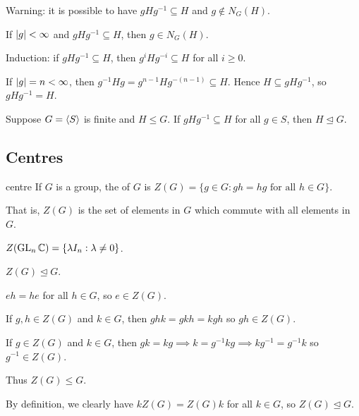 \documentclass[12pt,letterpaper]{report}
\begin{document}
Warning: it is possible to have $gHg^{-1} \subseteq H$ and $g \not\in N_G(H)$.

\begin{lem}{}{}
  If $\lvert g\rvert < \infty$ and $gHg^{-1} \subseteq H$, then $g \in N_G(H)$.
\end{lem}

\begin{thmproof}
  Induction: if $gHg^{-1} \subseteq H$, then $g^iHg^{-i} \subseteq H$ for all $i \geq 0$.

  If $\lvert g\rvert = n < \infty$, then $g^{-1}Hg = g^{n - 1}Hg^{-(n - 1)} \subseteq H$.
  Hence $H \subseteq gHg^{-1}$, so $gHg^{-1} = H$.
\end{thmproof}

\begin{cor}{}{}
  Suppose $G = \langle S\rangle$ is finite and $H \leq G$.
  If $gHg^{-1} \subseteq H$ for all $g \in S$, then $H \trianglelefteq G$.
\end{cor}

\pagebreak
\subsection{Centres}

\begin{defn}{centre}{}
  If $G$ is a group, the  of $G$ is
  $Z(G) = \{g \in G : gh = hg \text{ for all } h \in G\}$.
\end{defn}

That is, $Z(G)$ is the set of elements in $G$ which commute with all elements in $G$.

\begin{ex}
  $Z(\operatorname{GL}_n\mathbb{C}) = \{\lambda I_n : \lambda \neq 0\}$.
\end{ex}

\begin{prop}{}{}
  $Z(G) \trianglelefteq G$.
\end{prop}

\begin{thmproof}
  $eh = he$ for all $h \in G$, so $e \in Z(G)$.

  If $g, h \in Z(G)$ and $k \in G$, then $ghk = gkh = kgh$ so $gh \in Z(G)$.

  If $g \in Z(G)$ and $k \in G$, then $gk = kg \implies k = g^{-1}kg \implies kg^{-1} = g^{-1}k$ so
  $g^{-1} \in Z(G)$.

  Thus $Z(G) \leq G$.

  By definition, we clearly have $kZ(G) = Z(G)k$ for all $k \in G$, so $Z(G) \trianglelefteq G$.
\end{thmproof}
\end{document}
